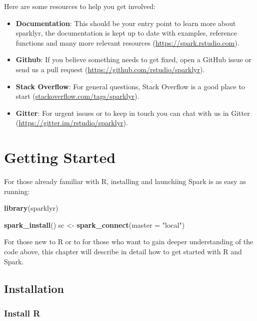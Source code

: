 \documentclass[]{book}
\newenvironment{Shaded}{\begin{snugshade}}{\end{snugshade}}
\newcommand{\KeywordTok}[1]{\textcolor[rgb]{0.13,0.29,0.53}{\textbf{#1}}}
\newcommand{\DataTypeTok}[1]{\textcolor[rgb]{0.13,0.29,0.53}{#1}}
\newcommand{\StringTok}[1]{\textcolor[rgb]{0.31,0.60,0.02}{#1}}
\newcommand{\NormalTok}[1]{#1}
\providecommand{\tightlist}{%
  \setlength{\itemsep}{0pt}\setlength{\parskip}{0pt}}
\theoremstyle{definition}
\theoremstyle{definition}
\theoremstyle{definition}
\theoremstyle{remark}
\begin{document}
Here are some resources to help you get involved:

\begin{itemize}
\tightlist
\item
  \textbf{Documentation}: This should be your entry point to learn more
  about sparklyr, the documentation is kept up to date with examples,
  reference functions and many more relevant resources
  (\url{https://spark.rstudio.com}).
\item
  \textbf{Github}: If you believe something needs to get fixed, open a
  GitHub issue or send us a pull request
  (\url{https://github.com/rstudio/sparklyr}).
\item
  \textbf{Stack Overflow}: For general questions, Stack Overflow is a
  good place to start (\url{stackoverflow.com/tags/sparklyr}).
\item
  \textbf{Gitter}: For urgent issues or to keep in touch you can chat
  with us in Gitter (\url{https://gitter.im/rstudio/sparklyr}).
\end{itemize}

\chapter{Getting Started}\label{started}

For those already familiar with R, installing and launchiing Spark is as
easy as running:

\begin{Shaded}
\begin{Highlighting}[]
\KeywordTok{library}\NormalTok{(sparklyr)}

\KeywordTok{spark_install}\NormalTok{()}
\NormalTok{sc <-}\StringTok{ }\KeywordTok{spark_connect}\NormalTok{(}\DataTypeTok{master =} \StringTok{"local"}\NormalTok{)}
\end{Highlighting}
\end{Shaded}

For those new to R or to for those who want to gain deeper understanding
of the code above, this chapter will describe in detail how to get
started with R and Spark.

\section{Installation}\label{installation}

\subsection{Install R}\label{install-r}
\end{document}
